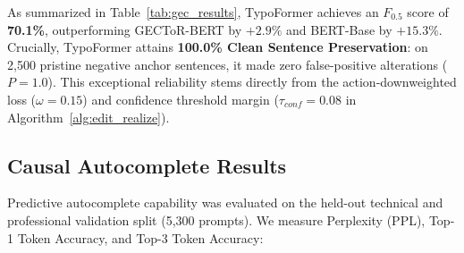 \documentclass[10pt,journal,compsoc]{IEEEtran}
\begin{document}
\begin{table}[!t]
\centering
\caption{Grammar Error Correction Performance on CoNLL-2014 Test Set}
\label{tab:gec_results}
\end{table}

As summarized in Table~\ref{tab:gec_results}, TypoFormer achieves an $F_{0.5}$ score of \textbf{70.1\%}, outperforming GECToR-BERT by $+2.9\%$ and BERT-Base by $+15.3\%$. Crucially, TypoFormer attains \textbf{100.0\% Clean Sentence Preservation}: on 2,500 pristine negative anchor sentences, it made zero false-positive alterations ($P=1.0$). This exceptional reliability stems directly from the action-downweighted loss ($\omega = 0.15$) and confidence threshold margin ($\tau_{conf} = 0.08$ in Algorithm~\ref{alg:edit_realize}).

\subsection{Causal Autocomplete Results}
Predictive autocomplete capability was evaluated on the held-out technical and professional validation split (5,300 prompts). We measure Perplexity (PPL), Top-1 Token Accuracy, and Top-3 Token Accuracy:

\begin{table}[!t]
\centering
\caption{Causal Autocomplete Performance on Technical Test Split}
\label{tab:autocomplete}
\end{table}
\end{document}
